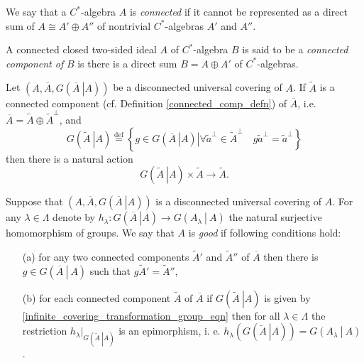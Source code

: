 \documentclass{beamer}
\theoremstyle{plain}
\newcommand{\be}{\begin{equation}}
\newcommand{\ee}{\end{equation}}
\newcommand{\la}{\lambda}
\newcommand{\La}{\Lambda}
\newcommand{\bydef}{\stackrel{\mathrm{def}}{=}}
\begin{document}
\begin{frame}
\begin{definition}\label{connected_c_a_defn}
	We say that a $C^*$-algebra $A$ is \textit{connected} if it cannot be represented as a direct sum of $A \cong A' \oplus A''$ of nontrivial $C^*$-algebras $A'$ and $A''$.
	
\end{definition}
\begin{definition}\label{connected_comp_defn}
	A connected closed two-sided ideal $A$ of  $C^*$-algebra $B$ is said to be a \textit{connected component of}  $B$ is there is a direct sum $B = A \oplus A'$ of $C^*$-algebras.
\end{definition}
Let $\left(A, \overline{A}, G\left(\left.\overline{A}~\right| A\right)\right)$ be a  disconnected universal covering of $A$. If $\widetilde A$ is a connected component (cf. Definition \ref{connected_comp_defn}) of $\overline{A}$, i.e. $\overline{A} = \widetilde A \oplus \widetilde A^\perp$, and
\be\label{infinite_covering_transformation_group_eqn}
G\left(\left.\widetilde{A}~\right| A\right)\bydef 
\left\{\left. g \in  G\left(\left.\overline{A}~\right| A\right)\right| \forall \widetilde a^\perp \in \widetilde A^\perp \quad g \widetilde a^\perp= \widetilde a^\perp\right\}
\ee
then there is a natural action
\be\label{gta_act_eqn}
G\left(\left.\widetilde{A}~\right| A\right)\times \widetilde{A} \to \widetilde{A}.
\ee
\end{frame}
\begin{frame}

\begin{definition}\label{good_defn}
   Suppose that $\left(A, \overline{A}, G\left(\left.\overline{A}~\right| A\right)\right)$ is a disconnected universal covering of $A$. For any $\la \in \La$ denote by $h_\la: G\left(\left.\overline{A}~\right| A\right) \to G\left(\left. A_\la~\right|~A \right)$ the natural surjective homomorphism of groups.
	We say  that $A$  is \textit{good} if  following conditions hold:
	\begin{enumerate}
		\item[(a)] for any two  {connected components}  $\widetilde{A}'$ and $\widetilde{A}''$  of $\overline A$ then there is  $g \in G\left(\left.\overline{A}~\right|~ A\right)$ such that $g \widetilde{A}'= \widetilde{A}''$,
		\item [(b)] for each connected component $\widetilde A$ of $\overline{A}$ if  $G\left(\left.\widetilde{A}~\right| A\right)$ is given by  \eqref{infinite_covering_transformation_group_eqn} then for all $\la \in \La$ the restriction $h_\la|_{G\left(\left.\widetilde{A}~\right| A\right)}$ is an epimorphism, i. e. $h_\la\left(G\left(\left.\widetilde{A}~\right| A\right) \right) = G\left(\left. A_\la~\right|~A \right)$.
	\end{enumerate}
\end{definition}

\end{frame}
\end{document}
